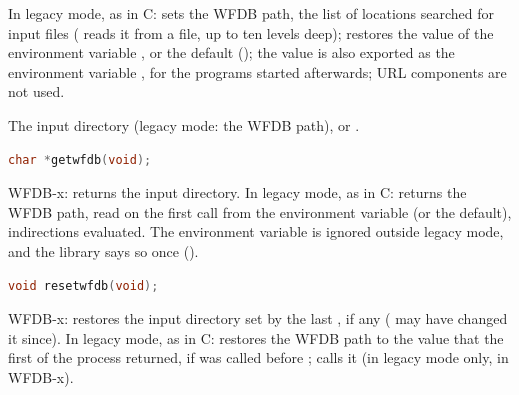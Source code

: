 In legacy mode, as in C: sets the WFDB path, the list of locations searched
for input files ( reads it from a file, up to ten levels deep);
 restores the value of the environment variable , or
the default (); the value is also exported as the
environment variable , for the programs started afterwards; URL
components are not used.
\begin{params}
\item[database\_path\_string] The input directory (legacy mode: the WFDB
  path), or .
\end{params}

\begin{lstlisting}[language=C,style=signature]
char *getwfdb(void);
\end{lstlisting}
WFDB-x: returns the input directory. In legacy mode, as in C: returns the
WFDB path, read on the first call from the environment variable 
(or the default),  indirections evaluated. The environment
variable  is ignored outside legacy mode, and the library says so
once ().

\begin{lstlisting}[language=C,style=signature]
void resetwfdb(void);
\end{lstlisting}
WFDB-x: restores the input directory set by the last , if any
( may have changed it since). In legacy mode, as
in C: restores the WFDB path to the value that the first  of the
process returned, if  was called before ;
 calls it (in legacy mode only, in WFDB-x).

